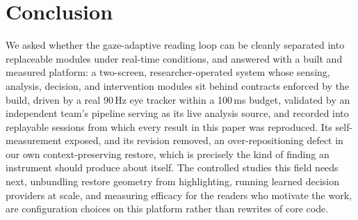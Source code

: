 \section{Conclusion}
\label{sec:conclusion}

We asked whether the gaze-adaptive reading loop can be cleanly separated into replaceable modules under real-time conditions, and answered with a built and measured platform: a two-screen, researcher-operated system whose sensing, analysis, decision, and intervention modules sit behind contracts enforced by the build, driven by a real 90\,Hz eye tracker within a 100\,ms budget, validated by an independent team's pipeline serving as its live analysis source, and recorded into replayable sessions from which every result in this paper was reproduced.
Its self-measurement exposed, and its revision removed, an over-repositioning defect in our own context-preserving restore, which is precisely the kind of finding an instrument should produce about itself.
The controlled studies this field needs next, unbundling restore geometry from highlighting, running learned decision providers at scale, and measuring efficacy for the readers who motivate the work, are configuration choices on this platform rather than rewrites of core code.
